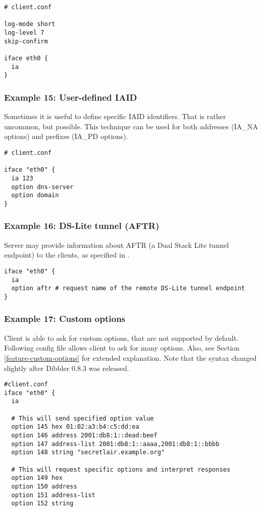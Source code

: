 \begin{lstlisting}
# client.conf

log-mode short
log-level 7
skip-confirm

iface eth0 {
  ia
}
\end{lstlisting}

\subsubsection{Example 15: User-defined IAID}
\label{example-client-iaid}
Sometimes it is useful to define specific IAID  identifiers. That is
rather uncommon, but possible. This technique can be used for both
addresses (IA\_NA options) and prefixes (IA\_PD options).

\begin{lstlisting}
# client.conf

iface "eth0" {
  ia 123
  option dns-server
  option domain
}
\end{lstlisting}

\subsubsection{Example 16: DS-Lite tunnel (AFTR)}
\label{example-server-ds-lite}
Server may provide information about AFTR (a Dual Stack Lite tunnel
endpoint) to the clients, as specified in \cite{rfc6334}.

\begin{lstlisting}
iface "eth0" {
  ia
  option aftr # request name of the remote DS-Lite tunnel endpoint
}
\end{lstlisting}

\subsubsection{Example 17: Custom options}
Client is able to ask for custom options, that are not supported by
default. Following config file allows client to ask for many
options. Also, see Section \ref{feature-custom-options} for
extended explanation. Note that the syntax changed slightly
after Dibbler 0.8.3 was released.

\begin{lstlisting}
#client.conf
iface "eth0" {
  ia

  # This will send specified option value  
  option 145 hex 01:02:a3:b4:c5:dd:ea
  option 146 address 2001:db8:1::dead:beef
  option 147 address-list 2001:db8:1::aaaa,2001:db8:1::bbbb
  option 148 string "secretlair.example.org"

  # This will request specific options and interpret responses
  option 149 hex
  option 150 address
  option 151 address-list
  option 152 string
\end{lstlisting}

